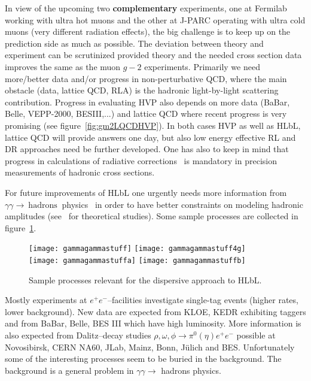 \documentclass[epj,onecolumn]{webofc}
\newcommand{\mbo}[1]{$#1$ }
\newcommand{\epm}{e^+e^- }
\begin{document}
In view of the upcoming two \textbf{complementary} experiments, one
at Fermilab working with ultra hot muons and the other at J-PARC
operating with ultra cold muons (very different radiation effects),
the big challenge is to keep up on the prediction side as much as
possible. The deviation between theory and experiment can be
scrutinized provided theory and the needed cross section data improves
the same as the muon \mbo{g-2} experiments. Primarily we need
more/better data and/or progress in non-perturbative QCD, where the
main obstacle (data, lattice QCD, RLA) is the hadronic light-by-light
scattering contribution. Progress in evaluating HVP also depends on
more data (BaBar, Belle, VEPP-2000, BESIII,...) and lattice QCD where
recent progress is very promising (see figure~\ref{fig:gm2LQCDHVP}). In
both cases HVP as well as HLbL, lattice QCD will provide answers one
day, but also low energy effective RL and DR approaches need be further
developed. One has also to keep in mind that progress in calculations of radiative
corrections~\cite{Actis:2010gg,CZYZ:2014yra,Jegerlehner:2017kke} is
mandatory in precision measurements of hadronic cross sections.


For future improvements of HLbL one urgently needs more information
from $\gamma\gamma \to \mathrm{ \ hadrons \ }$
physics~\cite{Babusci:2011bg,Nyffeler:2013oca} in order to have better
constraints on modeling hadronic amplitudes
(see~\cite{Mennessier:1982fk,Moussallam:2013una,Pennington14} for
theoretical studies). Some sample processes are collected in figure~\ref{fig:gammagammaetal}.
\begin{figure}[h]
\centering
\texttt{[image: gammagammastuff]}
\texttt{[image: gammagammastuff4g]}\\
\texttt{[image: gammagammastuffa]}
\texttt{[image: gammagammastuffb]}
\caption{Sample processes relevant for the dispersive approach to HLbL.}
\label{fig:gammagammaetal}
\end{figure}
Mostly experiments at $\epm$--facilities investigate single-tag events
(higher rates, lower background). New data are expected from KLOE,
KEDR exhibiting taggers and from BaBar, Belle, BES III which have high
luminosity. More information is also expected from Dalitz--decay
studies $\rho,\omega,\phi \to \pi^0(\eta)e^+e^-$ possible at
Novosibirsk, CERN NA60, JLab, Mainz, Bonn, J\"ulich and BES.
Unfortunately some of the interesting processes seem to be buried in
the background. The background is a general problem in $\gamma \gamma
\to $ hadrons physics.
\end{document}
